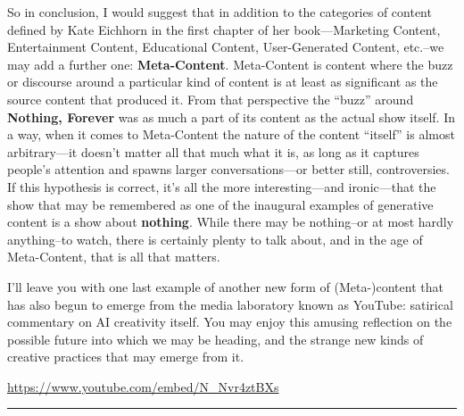 \documentclass[
  letterpaper,
  DIV=11,
  numbers=noendperiod,
  oneside]{scrartcl}
\begin{document}
So in conclusion, I would suggest that in addition to the categories of
content defined by Kate Eichhorn in the first chapter of her
book---Marketing Content, Entertainment Content, Educational Content,
User-Generated Content, etc.--we may add a further one:
\textbf{Meta-Content}. Meta-Content is content where the buzz or
discourse around a particular kind of content is at least as significant
as the source content that produced it. From that perspective the
``buzz'' around \textbf{Nothing, Forever} was as much a part of its
content as the actual show itself. In a way, when it comes to
Meta-Content the nature of the content ``itself'' is almost
arbitrary---it doesn't matter all that much what it is, as long as it
captures people's attention and spawns larger conversations---or better
still, controversies. If this hypothesis is correct, it's all the more
interesting---and ironic---that the show that may be remembered as one
of the inaugural examples of generative content is a show about
\textbf{nothing}. While there may be nothing--or at most hardly
anything--to watch, there is certainly plenty to talk about, and in the
age of Meta-Content, that is all that matters.

I'll leave you with one last example of another new form of
(Meta-)content that has also begun to emerge from the media laboratory
known as YouTube: satirical commentary on AI creativity itself. You may
enjoy this amusing reflection on the possible future into which we may
be heading, and the strange new kinds of creative practices that may
emerge from it.

\url{https://www.youtube.com/embed/N_Nvr4ztBXs}

\begin{center}\rule{0.5\linewidth}{0.5pt}\end{center}
\end{document}
